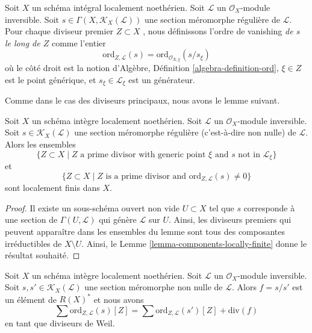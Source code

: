 \begin{definition}
\label{definition-order-vanishing-meromorphic}
Soit  $X$  un schéma intégral localement noethérien. Soit  $\mathcal{L}$  un
 $\mathcal{O}_X$-module inversible. Soit  $s \in \Gamma(X, \mathcal{K}_X(\mathcal{L}))$  une section méromorphe régulière
de  $\mathcal{L}$. Pour chaque diviseur premier  $Z \subset X$ , nous définissons
l'ordre de vanishing  {\it  de  $s$  le long de
 $Z$}  comme l'entier
$$
\text{ord}_{Z, \mathcal{L}}(s)
= \text{ord}_{\mathcal{O}_{X, \xi}}(s/s_\xi)
$$
où le côté droit est la notion d'Algèbre, Définition  \ref{algebra-definition-ord},  $\xi \in Z$ 
est le point générique, et  $s_\xi \in \mathcal{L}_\xi$  est un générateur.
\end{definition}

\noindent
Comme dans le cas des diviseurs principaux, nous avons le lemme suivant.

\begin{lemma}
\label{lemma-divisor-meromorphic-locally-finite}
Soit  $X$  un schéma intègre localement noethérien. Soit  $\mathcal{L}$  un
 $\mathcal{O}_X$-module inversible. Soit  $s \in \mathcal{K}_X(\mathcal{L})$  une section méromorphe régulière
(c’est-à-dire non nulle) de  $\mathcal{L}$. Alors les ensembles
$$
\{Z \subset X \mid Z \text{ a prime divisor with generic point }\xi
\text{ and }s\text{ not in }\mathcal{L}_\xi\}
$$
et
$$
\{Z \subset X \mid Z \text{ is a prime divisor and }
\text{ord}_{Z, \mathcal{L}}(s) \not = 0\}
$$
sont localement finis dans  $X$.
\end{lemma}

\begin{proof}
Il existe un sous-schéma ouvert non vide  $U \subset X$  tel que  $s$ 
corresponde à une section de  $\Gamma(U, \mathcal{L})$  qui génère  $\mathcal{L}$  sur
 $U$. Ainsi, les diviseurs premiers qui peuvent apparaître dans les
ensembles du lemme sont tous des composantes irréductibles de  $X \setminus U$. Ainsi,
le Lemme  \ref{lemma-components-locally-finite} donne le résultat souhaité.
\end{proof}

\begin{lemma}
\label{lemma-divisor-meromorphic-well-defined}
Soit  $X$  un schéma intègre localement noethérien. Soit  $\mathcal{L}$  un
 $\mathcal{O}_X$-module inversible. Soit  $s, s' \in \mathcal{K}_X(\mathcal{L})$  une section méromorphe non nulle
de  $\mathcal{L}$. Alors  $f = s/s'$  est un élément de  $R(X)^*$  et nous avons
$$
\sum \text{ord}_{Z, \mathcal{L}}(s)[Z]
=
\sum \text{ord}_{Z, \mathcal{L}}(s')[Z]
+
\text{div}(f)
$$
en tant que diviseurs de Weil.
\end{lemma}

